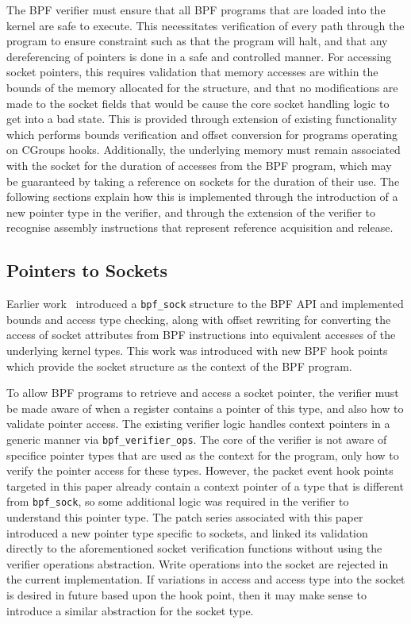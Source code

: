 \documentclass[10pt,sigconf,authorversion]{lpc}
\begin{document}

The BPF verifier must ensure that all BPF programs that are loaded into the
kernel are safe to execute. This necessitates verification of every path
through the program to ensure constraint such as that the program will halt,
and that any dereferencing of pointers is done in a safe and controlled manner.
For accessing socket pointers, this requires validation that memory accesses
are within the bounds of the memory allocated for the structure, and that no
modifications are made to the socket fields that would be cause the core socket
handling logic to get into a bad state. This is provided through extension of
existing functionality which performs bounds verification and offset conversion
for programs operating on CGroups hooks. Additionally, the underlying memory
must remain associated with the socket for the duration of accesses from the
BPF program, which may be guaranteed by taking a reference on sockets for the
duration of their use. The following sections explain how this is implemented
through the introduction of a new pointer type in the verifier, and through the
extension of the verifier to recognise assembly instructions that represent
reference acquisition and release.

\subsection{Pointers to Sockets}

Earlier work~\cite{bpf-sock} introduced a \verb+bpf_sock+ structure to the BPF
API and implemented bounds and access type checking, along with offset
rewriting for converting the access of socket attributes from BPF instructions
into equivalent accesses of the underlying kernel types. This work was
introduced with new BPF hook points which provide the socket structure as the
context of the BPF program.

To allow BPF programs to retrieve and access a socket pointer, the verifier
must be made aware of when a register contains a pointer of this type, and also
how to validate pointer access. The existing verifier logic handles context
pointers in a generic manner via \verb+bpf_verifier_ops+. The core of the
verifier is not aware of specifice pointer types that are used as the context
for the program, only how to verify the pointer access for these types.
However, the packet event hook points targeted in this paper already contain a
context pointer of a type that is different from \verb+bpf_sock+, so some
additional logic was required in the verifier to understand this pointer type.
The patch series associated with this paper introduced a new pointer type
specific to sockets, and linked its validation directly to the aforementioned
socket verification functions without using the verifier operations
abstraction. Write operations into the socket are rejected in the current
implementation. If variations in access and access type into the socket is
desired in future based upon the hook point, then it may make sense to
introduce a similar abstraction for the socket type.
\end{document}
